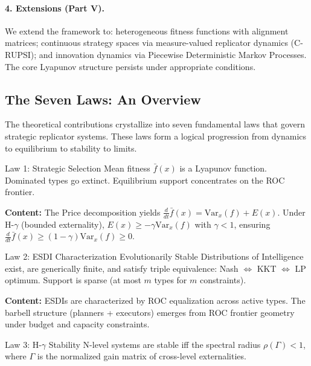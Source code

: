 \documentclass[12pt]{article}
\newcommand{\Var}{\mathrm{Var}}
\begin{document}
\paragraph{4. Extensions (Part V).} We extend the framework to: heterogeneous fitness functions with alignment matrices; continuous strategy spaces via measure-valued replicator dynamics (C-RUPSI); and innovation dynamics via Piecewise Deterministic Markov Processes. The core Lyapunov structure persists under appropriate conditions.


\subsection{The Seven Laws: An Overview}

The theoretical contributions crystallize into seven fundamental laws that govern strategic replicator systems. These laws form a logical progression from dynamics to equilibrium to stability to limits.

\begin{lawbox}{Law 1: Strategic Selection}
Mean fitness $\bar{f}(x)$ is a Lyapunov function. Dominated types go extinct. Equilibrium support concentrates on the ROC frontier.
\end{lawbox}

\noindent\textbf{Content:} The Price decomposition yields $\frac{d}{dt}\bar{f}(x) = \Var_x(f) + E(x)$. Under H-$\gamma$ (bounded externality), $E(x) \geq -\gamma \Var_x(f)$ with $\gamma < 1$, ensuring $\frac{d}{dt}\bar{f}(x) \geq (1-\gamma)\Var_x(f) \geq 0$.

\begin{lawbox}{Law 2: ESDI Characterization}
Evolutionarily Stable Distributions of Intelligence exist, are generically finite, and satisfy triple equivalence: Nash $\Leftrightarrow$ KKT $\Leftrightarrow$ LP optimum. Support is sparse (at most $m$ types for $m$ constraints).
\end{lawbox}

\noindent\textbf{Content:} ESDIs are characterized by ROC equalization across active types. The barbell structure (planners + executors) emerges from ROC frontier geometry under budget and capacity constraints.

\begin{lawbox}{Law 3: H-$\gamma$ Stability}
N-level systems are stable iff the spectral radius $\rho(\Gamma) < 1$, where $\Gamma$ is the normalized gain matrix of cross-level externalities.
\end{lawbox}
\end{document}
